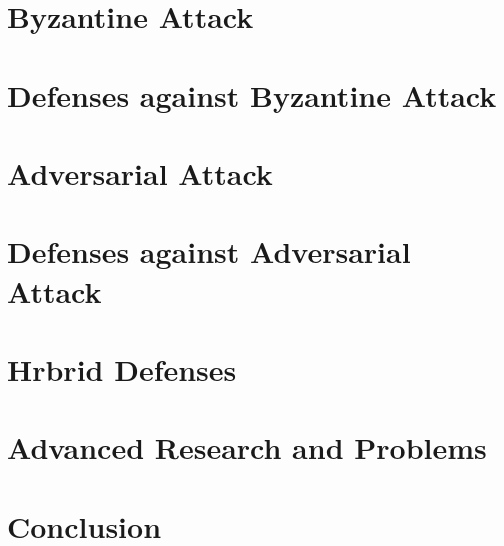 \documentclass[conference]{IEEEtran}
\begin{document}
\section{Byzantine Attack}
\section{Defenses against Byzantine Attack}
\section{Adversarial Attack}
\section{Defenses against Adversarial Attack}
\section{Hrbrid Defenses}
\section{Advanced Research and Problems}
\section{Conclusion}
\end{document}
